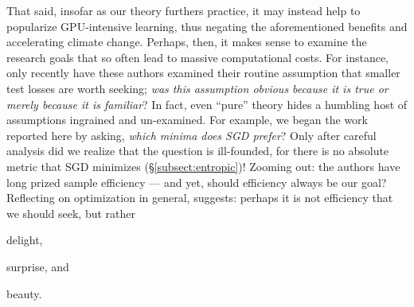 \documentclass{article}
\theoremstyle{plain}
\theoremstyle{definition}
\begin{document}
    That said, insofar as our theory furthers practice, it may instead help to
    popularize GPU-intensive learning, thus negating the
    aforementioned benefits and accelerating climate change.
    Perhaps, then, it makes sense to examine the research goals that so often
    lead to massive computational costs.  For instance, only recently have
    these authors examined their routine assumption that smaller test losses
    are worth seeking; \emph{was this assumption obvious because it is true or
    merely because it is familiar}?
    In fact, even ``pure'' theory hides a humbling host of assumptions
    ingrained and un-examined.  For example, we began the work reported here by
    asking, \textit{which minima does SGD prefer}?  Only after careful analysis
    did we realize that the question is ill-founded, for there is no absolute
    metric that SGD minimizes (\S\ref{subsect:entropic})! 
    Zooming out: the authors have long prized sample efficiency --- and yet,
    should efficiency always be our goal?  Reflecting on
    optimization in general, \cite{ar19} suggests: perhaps it is not efficiency
    that we should seek, but rather
    \par \hfill delight, \phantom{surprise, and beauty.~~~~}
    \par \hfill surprise, and \phantom{beauty.~~}
    \par \hfill beauty.


%
        
\end{document}

